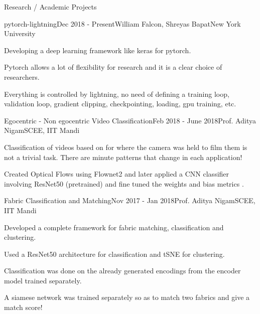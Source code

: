 \documentclass{resume} %
\begin{document}
\begin{rSection}{Research / Academic Projects}
  \begin{rSubsection}{pytorch-lightning}{Dec 2018 - Present}{William Falcon, Shreyas Bapat}{New York University}
\item Developing a deep learning framework like keras for pytorch. 
\item  Pytorch allows a lot of flexibility for research and it is a clear choice of researchers.
\item Everything is controlled by lightning, no need of defining a training loop, validation loop, gradient clipping, checkpointing, loading, gpu training, etc.
 \end{rSubsection}

\begin{rSubsection}{Egocentric - Non egocentric Video Classification}{Feb 2018 - June 2018}{Prof. Aditya Nigam}{SCEE, IIT Mandi}
\item Classification of videos based on for where the camera was held to film them is not a trivial task. There are minute patterns that change in each application! 
\item  Created Optical Flows using Flownet2 and later applied a CNN classifier involving ResNet50 (pretrained) and fine tuned the weights and bias metrics .
 \end{rSubsection}
 
 \begin{rSubsection}{Fabric Classification and Matching}{Nov 2017 - Jan 2018}{Prof. Aditya Nigam}{SCEE, IIT Mandi}
\item Developed a complete framework for fabric matching, classification and clustering. 
\item  Used a ResNet50 architecture for classification and tSNE for clustering.
\item Classification was done on the already generated encodings from the encoder model trained separately.
\item A siamese network was trained separately so as to match two fabrics and give a match score!
 \end{rSubsection}
 
 \end{rSection}
 
\end{document}
